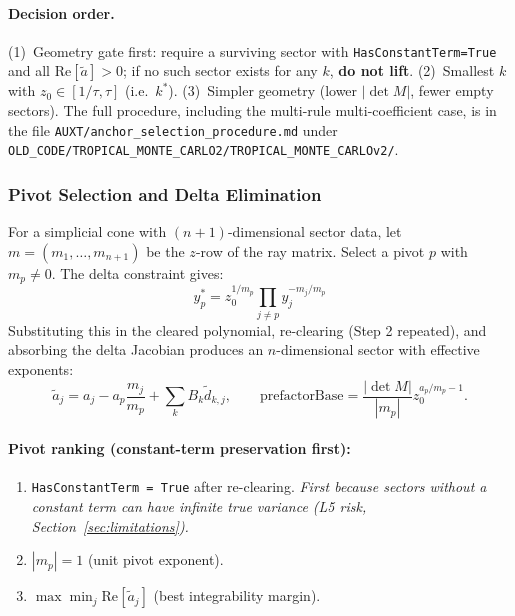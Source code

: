 \documentclass[11pt,a4paper]{article}
\begin{document}
\paragraph{Decision order.} (1)~Geometry gate first: require a surviving sector with \texttt{HasConstantTerm=True} and all $\mathrm{Re}[\tilde{a}]>0$; if no such sector exists for any $k$, \textbf{do not lift}. (2)~Smallest $k$ with $z_0\in[1/\tau,\tau]$ (i.e.\ $k^{*}$). (3)~Simpler geometry (lower $|\det M|$, fewer empty sectors). The full procedure, including the multi-rule multi-coefficient case, is in the file \texttt{AUXT/anchor\_selection\_procedure.md} under \texttt{OLD\_CODE/TROPICAL\_MONTE\_CARLO2/TROPICAL\_MONTE\_CARLOv2/}.

\subsubsection{Pivot Selection and Delta Elimination}

For a simplicial cone with $(n{+}1)$-dimensional sector data, let $m=(m_1,\ldots,m_{n+1})$ be the $z$-row of the ray matrix. Select a pivot $p$ with $m_p\neq 0$. The delta constraint gives:
\begin{equation}
y_p^* = z_0^{1/m_p}\prod_{j\neq p}y_j^{-m_j/m_p}
\end{equation}
Substituting this in the cleared polynomial, re-clearing (Step 2 repeated), and absorbing the delta Jacobian produces an $n$-dimensional sector with effective exponents:
\begin{equation}
\tilde{a}_j = a_j - a_p\frac{m_j}{m_p} + \sum_k B_k\tilde{d}_{k,j}, \qquad
\text{prefactorBase} = \frac{|\det M|}{|m_p|}z_0^{a_p/m_p-1}.
\end{equation}

\paragraph{Pivot ranking (constant-term preservation first):}
\begin{enumerate}
  \item \texttt{HasConstantTerm = True} after re-clearing. \emph{First because sectors without a constant term can have infinite true variance (L5 risk, Section~\ref{sec:limitations}).}
  \item $|m_p|=1$ (unit pivot exponent).
  \item $\max\min_j\mathrm{Re}[\tilde{a}_j]$ (best integrability margin).
\end{enumerate}
\end{document}
